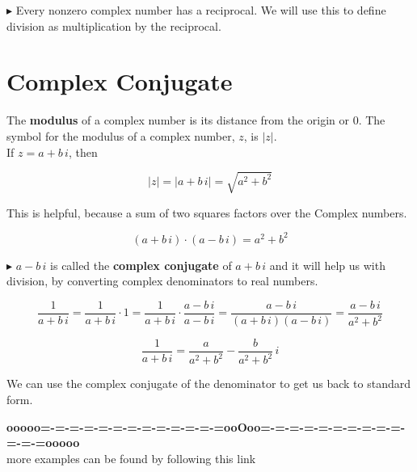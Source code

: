 \documentclass{ximera}
\begin{document}
$\blacktriangleright$  Every nonzero complex number has a reciprocal.  We will use this to define division as multiplication by the reciprocal.





\section{Complex Conjugate}


The \textbf{modulus} of a complex number is its distance from the origin or $0$.  The symbol for the modulus of a complex number, $z$, is $|z|$.  \\

If $z = a + b \, i$, then

\[    |z| = |a + b \, i| = \sqrt{a^2 + b^2}          \]



This is helpful, because a sum of two squares factors over the Complex numbers.



\[   (a + b \, i) \cdot    (a - b \, i)  = a^2 + b^2   \]



$\blacktriangleright$  $a - b \, i$ is called the \textbf{complex conjugate} of $a + b \, i$ and it will help us with division, by converting complex denominators to real numbers.




\[   \frac{1}{a + b \, i} =   \frac{1}{a + b \, i} \cdot 1 = \frac{1}{a + b \, i} \cdot \frac{a - b \, i}{a - b \, i}  =  \frac{a - b \, i}{(a + b \, i)(a - b \, i)} =   \frac{a - b \, i}{a^2 + b^2}  \]


\[  \frac{1}{a + b \, i}   =  \frac{a}{a^2 + b^2} - \frac{b}{a^2 + b^2} \, i      \]


We can use the complex conjugate of the denominator to get us back to standard form.















\begin{center}
\textbf{\textcolor{green!50!black}{ooooo=-=-=-=-=-=-=-=-=-=-=-=-=ooOoo=-=-=-=-=-=-=-=-=-=-=-=-=ooooo}} \\

more examples can be found by following this link\\ 

\end{center}
\end{document}
